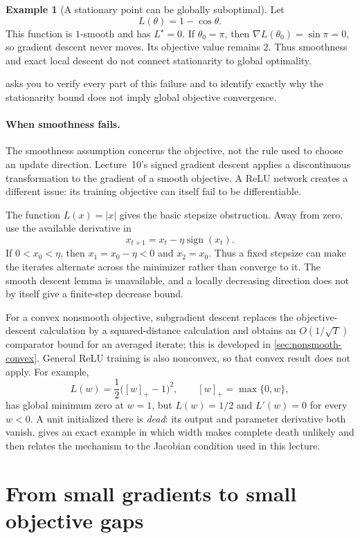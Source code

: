\documentclass[11pt,twoside]{article}
\theoremstyle{definition}
\newtheorem{example}[theorem]{Example}
\theoremstyle{remark}
\begin{document}
\begin{example}[A stationary point can be globally suboptimal]
\label{ex:cosine-trap}
Let
\[
 L(\theta)=1-\cos\theta.
\]
This function is $1$-smooth and has $L^\star=0$. If
$\theta_0=\pi$, then $\nabla L(\theta_0)=\sin\pi=0$, so gradient descent
never moves. Its objective value remains $2$. Thus smoothness and exact local
descent do not connect stationarity to global optimality.
\end{example}

 asks you to verify every part of this failure
and to identify exactly why the stationarity bound does not imply global
objective convergence.

\paragraph{When smoothness fails.}
The smoothness assumption concerns the objective, not the rule used to choose
an update direction. Lecture~10's signed gradient descent applies a
discontinuous transformation to the gradient of a smooth objective. A ReLU
network creates a different issue: its training objective can itself fail to
be differentiable.

The function $L(x)=|x|$ gives the basic stepsize obstruction. Away from zero,
use the available derivative in
\[
 x_{t+1}=x_t-\eta\operatorname{sign}(x_t).
\]
If $0<x_0<\eta$, then $x_1=x_0-\eta<0$ and $x_2=x_0$. Thus a fixed
stepsize can make the iterates alternate across the minimizer rather than
converge to it. The smooth descent lemma is unavailable, and a locally
decreasing direction does not by itself give a finite-step decrease bound.

For a convex nonsmooth objective, subgradient descent replaces the
objective-descent calculation by a squared-distance calculation and obtains
an $O(1/\sqrt T)$ comparator bound for an averaged iterate; this is developed
in \cref{sec:nonsmooth-convex}. General ReLU training is also nonconvex, so
that convex result does not apply. For example,
\[
 L(w)=\frac12\bigl([w]_+-1\bigr)^2,
 \qquad [w]_+=\max\{0,w\},
\]
has global minimum zero at $w=1$, but $L(w)=1/2$ and $L'(w)=0$ for every
$w<0$. A unit initialized there is \emph{dead}: its output and parameter
derivative both vanish.  gives an exact example in which
width makes complete death unlikely and then relates the mechanism to the
Jacobian condition used in this lecture.

\section{From small gradients to small objective gaps}
\label{sec:global-certificates}
\end{document}

